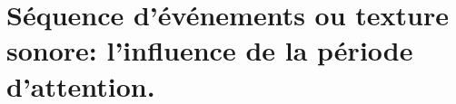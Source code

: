 \chapter[Expérience annexe: période d'attention]{Séquence d'événements ou texture sonore: l'influence de la période d'attention.}
\label{app:xp_texture}


%
%
%
%
%
%
